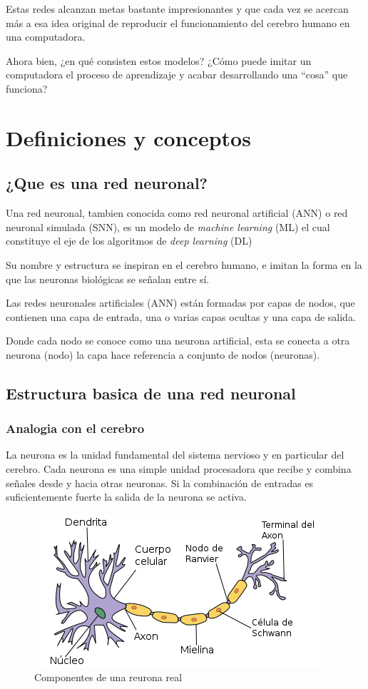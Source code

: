 \documentclass[runningheads]{llncs} %
\begin{document}
Estas redes alcanzan metas bastante impresionantes y que cada vez se acercan 
más a esa idea original de reproducir el funcionamiento del cerebro humano 
en una computadora. 

Ahora bien, ¿en qué consisten estos modelos? ¿Cómo puede imitar un computadora 
el proceso de aprendizaje y acabar desarrollando una
\textquotedblleft{cosa}\textquotedblright{} que funciona? \cite{int2}
\section{Definiciones y conceptos}
\subsection{¿Que es una red neuronal?}
Una red neuronal, tambien conocida como red neuronal artificial (ANN)
o red neuronal simulada (SNN), es un modelo de \textit{machine learning} (ML)
el cual constituye el eje de los algoritmos de \textit{deep learning} (DL) 

Su nombre y estructura se inspiran en el cerebro humano, 
e imitan la forma en la que las neuronas biológicas se señalan entre sí.

Las redes neuronales artificiales (ANN) están formadas por capas de nodos, 
que contienen una capa de entrada, una o varias capas ocultas y una capa de salida.
\cite{def-ibm1}

Donde cada nodo se conoce como una neurona artificial, esta se conecta a 
otra neurona (nodo) la capa hace referencia a conjunto de nodos (neuronas).

\subsection{Estructura basica de una red neuronal}
\subsubsection{Analogia con el cerebro}
La neurona es la unidad fundamental del sistema nervioso y en particular 
del cerebro. Cada neurona es una simple unidad procesadora que recibe y combina 
señales desde y hacia otras neuronas. 
Si la combinación de entradas es suficientemente fuerte la salida de la neurona
se activa. \cite{libro-def}

\begin{figure}
    \centering
    \includegraphics[scale=0.6]{neurona_real.png}
    \caption{Componentes de una reurona real}
    \label{fig:neurona_real}
\end{figure}
\end{document}
